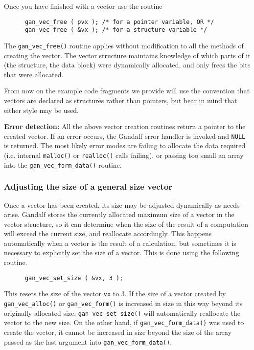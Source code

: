 Once you have finished with a vector use the routine
\begin{verbatim}
      gan_vec_free ( pvx ); /* for a pointer variable, OR */
      gan_vec_free ( &vx ); /* for a structure variable */
\end{verbatim}
The {\tt gan\_vec\_free()} routine applies without modification to all
the methods of creating the vector. The vector structure maintains
knowledge of which parts of it (the structure, the data block) were
dynamically allocated, and only frees the bits that were allocated.

From now on the example code fragments we provide will use the convention
that vectors are declared as structures rather than pointers, but bear in
mind that either style may be used.

{\bf Error detection:} All the above vector creation routines return a
pointer to the created vector.
If an error occurs, the Gandalf error handler is invoked and {\tt NULL}
is returned. The most likely error modes are failing
to allocate the data required (i.e. internal {\tt malloc()} or {\tt realloc()}
calls failing), or passing too small an array into the
{\tt gan\_vec\_form\_data()} routine.

\subsubsection{Adjusting the size of a general size vector}
\label{set-size-vec-sec}
Once a vector has been created, its size may be adjusted dynamically
as needs arise. Gandalf stores the currently allocated maximum size of
a vector in the vector structure, so it can determine when the size of
the result of a computation will exceed the current size, and reallocate
accordingly. This happens automatically when a vector is the result
of a calculation, but sometimes it is necessary to explicitly set the
size of a vector. This is done using the following routine.
\begin{verbatim}
      gan_vec_set_size ( &vx, 3 );
\end{verbatim}
This resets the size of the vector {\tt vx} to 3.
If the size of a vector created
by {\tt gan\_vec\_alloc()} or {\tt gan\_vec\_form()} is increased in size
in this way beyond its originally allocated size, {\tt gan\_vec\_set\_size()}
will automatically reallocate the vector to the new size.
On the other hand, if {\tt gan\_vec\_form\_data()} was used to create the
vector, it cannot be increased in size beyond the size of the array
passed as the last argument into {\tt gan\_vec\_form\_data()}.

